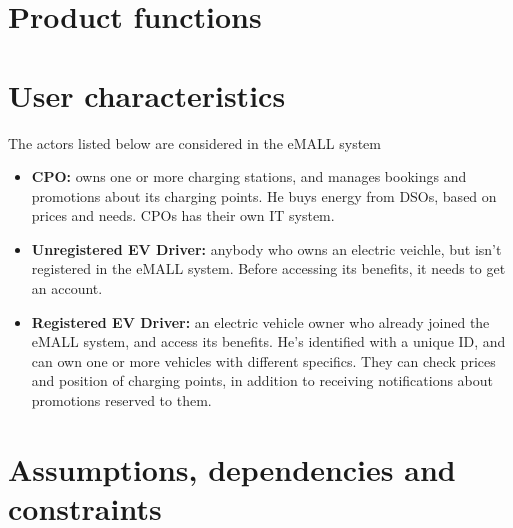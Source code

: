 \section{Product functions}\label{sec:product_functions}


\section{User characteristics}\label{sec:user_characteristics}
The actors listed below are considered in the eMALL system
\begin{itemize}
	\item \textbf{CPO:} owns one or more charging stations, and manages bookings and promotions about its charging points. He buys energy from DSOs, based on prices and needs. CPOs has their own IT system.
	\item \textbf{Unregistered EV Driver:} anybody who owns an electric veichle, but isn’t registered in the eMALL system. Before accessing its benefits, it needs to get an account.
	\item \textbf{Registered EV Driver:} an electric vehicle owner who already joined the eMALL system, and access its benefits. He’s identified with a unique ID, and can own one or more vehicles with different specifics. They can check prices and position of charging points, in addition to receiving notifications about promotions reserved to them.
\end{itemize}

\section{Assumptions, dependencies and constraints}\label{sec:assumptions_dependencies_and_constraints}